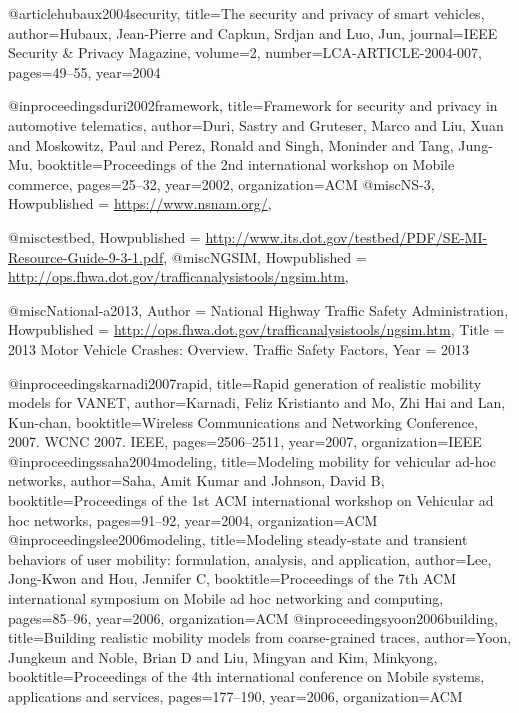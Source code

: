 {{{{{{{	@article{hubaux2004security,
	title={The security and privacy of smart vehicles},
	author={Hubaux, Jean-Pierre and Capkun, Srdjan and Luo, Jun},
	journal={IEEE Security \& Privacy Magazine},
	volume={2},
	number={LCA-ARTICLE-2004-007},
	pages={49--55},
	year={2004}
	}
	
	
	
	@inproceedings{duri2002framework,
	title={Framework for security and privacy in automotive telematics},
	author={Duri, Sastry and Gruteser, Marco and Liu, Xuan and Moskowitz, Paul and Perez, Ronald and Singh, Moninder and Tang, Jung-Mu},
	booktitle={Proceedings of the 2nd international workshop on Mobile commerce},
	pages={25--32},
	year={2002},
	organization={ACM}
	}
	@misc{NS-3,
	Howpublished = {\url{https://www.nsnam.org/}}},
}
@misc{testbed,
	Howpublished = {\url{http://www.its.dot.gov/testbed/PDF/SE-MI-Resource-Guide-9-3-1.pdf}}},
@misc{NGSIM,
	Howpublished = {\url{http://ops.fhwa.dot.gov/trafficanalysistools/ngsim.htm}},
}

@misc{National-a2013,
	Author = {National Highway Traffic Safety Administration},
	Howpublished = {\url{http://ops.fhwa.dot.gov/trafficanalysistools/ngsim.htm}},
	Title = {2013 Motor Vehicle Crashes: Overview. Traffic Safety Factors},
	Year = {2013}
}

@inproceedings{karnadi2007rapid,
	title={Rapid generation of realistic mobility models for VANET},
	author={Karnadi, Feliz Kristianto and Mo, Zhi Hai and Lan, Kun-chan},
	booktitle={Wireless Communications and Networking Conference, 2007. WCNC 2007. IEEE},
	pages={2506--2511},
	year={2007},
	organization={IEEE}
}
@inproceedings{saha2004modeling,
	title={Modeling mobility for vehicular ad-hoc networks},
	author={Saha, Amit Kumar and Johnson, David B},
	booktitle={Proceedings of the 1st ACM international workshop on Vehicular ad hoc networks},
	pages={91--92},
	year={2004},
	organization={ACM}
}
@inproceedings{lee2006modeling,
	title={Modeling steady-state and transient behaviors of user mobility: formulation, analysis, and application},
	author={Lee, Jong-Kwon and Hou, Jennifer C},
	booktitle={Proceedings of the 7th ACM international symposium on Mobile ad hoc networking and computing},
	pages={85--96},
	year={2006},
	organization={ACM}
}
@inproceedings{yoon2006building,
	title={Building realistic mobility models from coarse-grained traces},
	author={Yoon, Jungkeun and Noble, Brian D and Liu, Mingyan and Kim, Minkyong},
	booktitle={Proceedings of the 4th international conference on Mobile systems, applications and services},
	pages={177--190},
	year={2006},
	organization={ACM}
}

}}}}}}
